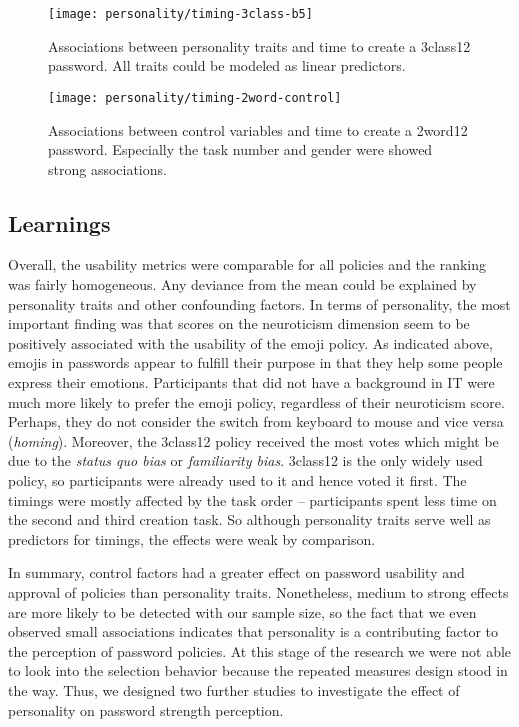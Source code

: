 \begin{figure}
	\texttt{[image: personality/timing-3class-b5]}
	\caption{\label{fig:personality:timing-3class-b5}Associations between personality traits and time to create a 3class12 password. All traits could be modeled as linear predictors.}
\end{figure}

\begin{figure}
	\texttt{[image: personality/timing-2word-control]}
	\caption{\label{fig:personality:timing-2word-control}Associations between control variables and time to create a 2word12 password. Especially the task number and gender were showed strong associations.}
\end{figure}



\subsection{Learnings}
Overall, the usability metrics were comparable for all policies and the ranking was fairly homogeneous. Any deviance from the mean could be explained by personality traits and other confounding factors. In terms of personality, the most important finding was that scores on the neuroticism dimension seem to be positively associated with the usability of the emoji policy. As indicated above, emojis in passwords appear to fulfill their purpose in that they help some people express their emotions. Participants that did not have a background in IT were much more likely to prefer the emoji policy, regardless of their neuroticism score. Perhaps, they do not consider the switch from keyboard to mouse and vice versa (\textit{homing}). Moreover, the 3class12 policy received the most votes which might be due to the \textit{status quo bias} or \textit{familiarity bias}. 3class12 is the only widely used policy, so participants were already used to it and hence voted it first. The timings were mostly affected by the task order -- participants spent less time on the second and third creation task. So although personality traits serve well as predictors for timings, the effects were weak by comparison. 

In summary, control factors had a greater effect on password usability and approval of policies than personality traits. Nonetheless, medium to strong effects are more likely to be detected with our sample size, so the fact that we even observed small associations indicates that personality is a contributing factor to the perception of password policies. At this stage of the research we were not able to look into the selection behavior because the repeated measures design stood in the way. Thus, we designed two further studies to investigate the effect of personality on password strength perception. 

